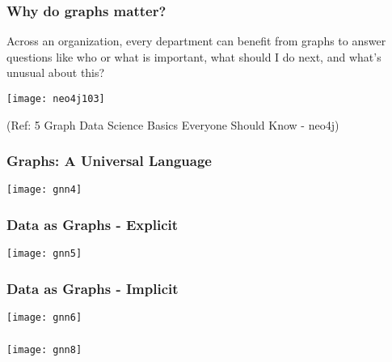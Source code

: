 \begin{frame}\frametitle{ Why do graphs matter? }

Across an organization, every department can benefit from graphs to answer questions 
like who or what is important, what should I do next, and what’s unusual about this?

\begin{center}
\texttt{[image: neo4j103]}
\end{center}	  


{\tiny (Ref: 5 Graph Data Science Basics Everyone Should Know - neo4j)}
\end{frame}

\begin{frame}[fragile]\frametitle{Graphs: A Universal Language }

\begin{center}
\texttt{[image: gnn4]}
\end{center}	  

\end{frame}


\begin{frame}[fragile]\frametitle{Data as Graphs - Explicit }

\begin{center}
\texttt{[image: gnn5]}
\end{center}	  

\end{frame}

\begin{frame}[fragile]\frametitle{Data as Graphs - Implicit }

\begin{center}
\texttt{[image: gnn6]}
\end{center}	  

\end{frame}



\begin{frame}[fragile]\frametitle{}

\begin{center}
\texttt{[image: gnn8]}
\end{center}	  

\end{frame}


